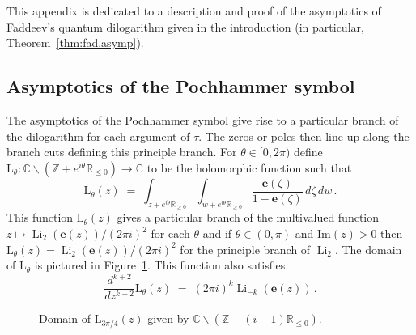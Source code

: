 \documentclass[12pt,reqno]{amsart}
\theoremstyle{definition}
\def\BZ{\mathbb Z}
\def\BR{\mathbb R}
\def\BC{\mathbb C}
\def\Im{\mathrm{Im}}
\def\be{\begin{equation}}
\def\ee{\end{equation}}
\def\z{\zeta}
\def\e{\mathbf e}
\renewcommand{\=}{\;=\;}
\newcommand{\Li}{\operatorname{Li}}
\begin{document}
This appendix is dedicated to a description and proof of the asymptotics of Faddeev's quantum dilogarithm given in the introduction (in particular, Theorem~\ref{thm:fad.asymp}).

\subsection{Asymptotics of the Pochhammer symbol}

The asymptotics of the Pochhammer symbol give rise to a particular branch of the dilogarithm for each argument of $\tau$. The zeros or poles then line up along the branch cuts defining this principle branch. For $\theta\in[0,2\pi)$ define $\mathrm{L}_{\theta}:\BC\backslash(\BZ+e^{i\theta}\BR_{\leq0})\rightarrow\BC$ to be the holomorphic function such that
\be
  \mathrm{L}_{\theta}(z)
  \=
  \int_{z+e^{i\theta}\BR_{\geq0}}
  \int_{w+e^{i\theta}\BR_{\geq0}}
  \frac{\e(\z)}{1-\e(\z)}\,d\z\,dw\,.
\ee
This function $\mathrm{L}_{\theta}(z)$ gives a particular branch of the multivalued  function $z\mapsto\Li_{2}(\e(z))/(2\pi i)^2$ for each $\theta$ and if $\theta\in(0,\pi)$ and $\Im(z)>0$ then $\mathrm{L}_{\theta}(z)=\Li_{2}(\e(z))/(2\pi i)^2$ for the principle branch of $\Li_2$. The domain of $\mathrm{L}_{\theta}$ is pictured in Figure~\ref{fig:prin.bran}. This function also satisfies
\be
  \frac{d^{k+2}}{dz^{k+2}}
  \mathrm{L}_{\theta}(z)
  \=
  (2\pi i)^{k}\Li_{-k}(\e(z))\,.
\ee
\begin{center}
\begin{figure}
\caption{Domain of $\mathrm{L}_{3\pi/4}(z)$ given by $\BC\backslash(\BZ+(i-1)\BR_{\leq0})$.}
\label{fig:prin.bran}
\end{figure}
\end{center}
\end{document}
